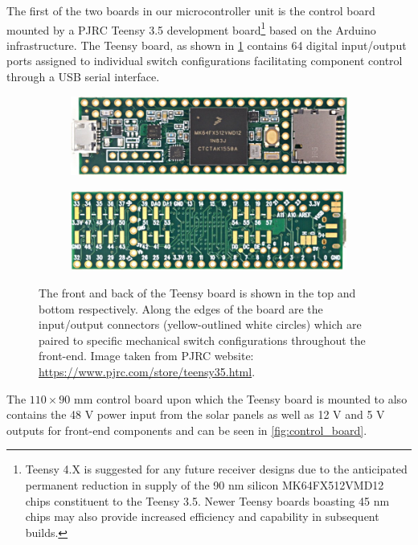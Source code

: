 The first of the two boards in our microcontroller unit is the control board mounted by a PJRC Teensy 3.5 development board\footnote{Teensy 4.X is suggested for any future receiver designs due to the anticipated permanent reduction in supply of the 90 nm silicon MK64FX512VMD12 chips constituent to the Teensy 3.5. Newer Teensy boards boasting 45 nm chips may also provide increased efficiency and capability in subsequent builds.} based on the Arduino infrastructure. The Teensy board, as shown in \cref{fig:teensy} contains 64 digital input/output ports assigned to individual switch configurations facilitating component control through a USB serial interface.
\begin{figure}
    \centering
    \begin{subfigure}{0.5\textwidth}
        \includegraphics[width=\textwidth]{teensy_top}
    \end{subfigure}
    \begin{subfigure}{0.5\textwidth}
        \includegraphics[width=\textwidth]{teensy_bottom}
    \end{subfigure}
    \caption{The front and back of the Teensy board is shown in the top and bottom respectively. Along the edges of the board are the input/output connectors (yellow-outlined white circles) which are paired to specific mechanical switch configurations throughout the front-end. Image taken from PJRC website: \url{https://www.pjrc.com/store/teensy35.html}.}
    \label{fig:teensy}
\end{figure}
The $110 \times 90$ mm control board upon which the Teensy board is mounted to also contains the 48 V power input from the solar panels as well as 12 V and 5 V outputs for front-end components and can be seen in \cref{fig:control_board}.
